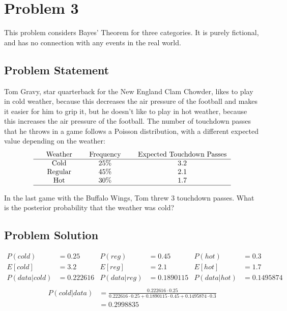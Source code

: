 \documentclass[12pt]{article}
\theoremstyle{definition}
\begin{document}
\newpage
\section*{Problem 3}

This problem considers Bayes' Theorem for three categories. It is purely fictional, and has no connection with any events in the real world.

\subsection*{Problem Statement}

Tom Gravy, star quarterback for the New England Clam Chowder, likes to play in cold weather, because this decreases the air pressure of the football and makes it easier for him to grip it, but he doesn't like to play in hot weather, because this increases the air pressure of the football. The number of touchdown passes that he throws in a game follows a Poisson distribution, with a different expected value depending on the weather:
$$
\begin{tabular}{ccccccc}
& Weather & & Frequency & & Expected Touchdown Passes\\
\hline
& Cold & & 25\% & & 3.2\\
& Regular & & 45\% & & 2.1\\
& Hot & & 30\% & & 1.7\\
\hline
\end{tabular}
$$

\bigskip
In the last game with the Buffalo Wings, Tom threw 3 touchdown passes. What is the posterior probability that the weather was cold?


\subsection*{Problem Solution}
\begin{align*}
P(cold) &= 0.25 &P(reg) &= 0.45 &P(hot) &= 0.3\\
E[cold] &= 3.2 &E[reg] &= 2.1 &E[hot] &= 1.7\\
P(data|cold) &= 0.222616 & P(data|reg) &= 0.1890115 &P(data|hot) &= 0.1495874\\
\end{align*}
\begin{align*}
P(cold|data) &= \frac{0.222616 \cdot 0.25}{0.222616 \cdot 0.25 + 0.1890115 \cdot 0.45 + 0.1495874 \cdot 0.3}\\
&= 0.2998835
\end{align*}
\end{document}

